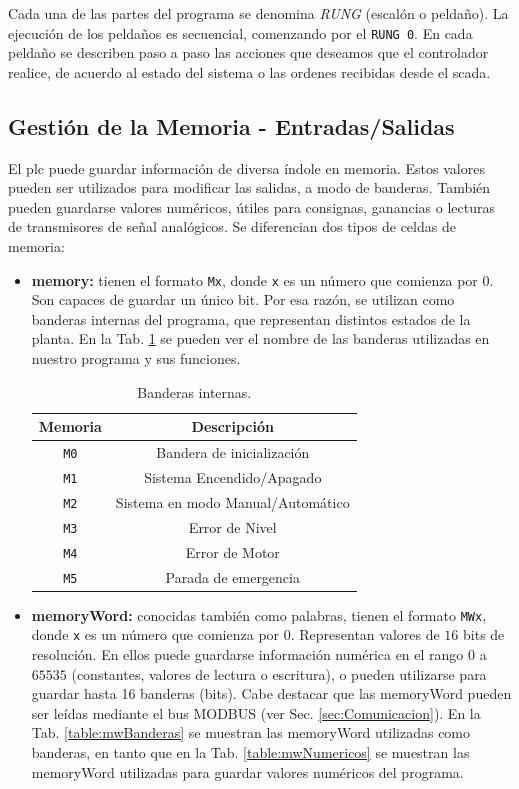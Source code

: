 Cada una de las partes del programa se denomina \emph{RUNG} (escalón o
peldaño).
La ejecución de los peldaños es secuencial, comenzando por el  \verb|RUNG 0|.
En cada peldaño se describen paso a paso las acciones que deseamos que
el controlador realice, de acuerdo al estado del sistema o las ordenes
recibidas desde el \gls{scada}.

\subsection{Gestión de la Memoria - Entradas/Salidas}

El \gls{plc} puede guardar información de diversa índole en memoria.
Estos valores pueden ser utilizados para modificar las salidas, a
modo de banderas.
También pueden guardarse valores numéricos, útiles para consignas,
ganancias o lecturas de transmisores de señal analógicos.
Se diferencian dos tipos de celdas de memoria:

\begin{itemize}
 \item \textbf{\gls{memory}:} tienen el formato \verb|Mx|, donde \verb|x| es un
número que comienza por $0$.
Son capaces de guardar un único bit.
Por esa razón, se utilizan como banderas internas del programa, que representan
distintos estados de la planta.
En la Tab. \ref{table:Banderasinternas} se pueden ver el nombre
de las banderas utilizadas en nuestro programa y sus funciones.
\begin{table}[ht]
\renewcommand{\arraystretch}{1.3}
\centering
\begin{tabular}{c||c}
\hline
\bfseries Memoria & \bfseries Descripción\\
\hline \hline
\verb|M0|  & Bandera de inicialización\\
\verb|M1|  & Sistema Encendido/Apagado\\
\verb|M2|  & Sistema en modo Manual/Automático\\
\verb|M3|  & Error de Nivel\\
\verb|M4|  & Error de Motor\\
\verb|M5|  & Parada de emergencia\\
\hline
\end{tabular}
\caption{Banderas internas.}
\label{table:Banderasinternas}
\end{table}

 \item \textbf{\gls{memoryWord}:} conocidas también como palabras, tienen el
formato \verb|MWx|, donde \verb|x| es un número que comienza por $0$.
Representan valores de $16$ bits de resolución. En ellos puede guardarse
información numérica en el rango $0$ a $65535$
(constantes, valores de lectura o escritura), o pueden utilizarse para guardar
hasta 16 banderas (bits).
Cabe destacar que las \gls{memoryWord} pueden ser leídas mediante el bus MODBUS
(ver Sec. \ref{sec:Comunicacion}).
En la Tab. \ref{table:mwBanderas} se muestran las \gls{memoryWord}
utilizadas como banderas, en tanto que en la Tab.
\ref{table:mwNumericos}
se muestran las \gls{memoryWord} utilizadas para guardar valores numéricos del
programa.
\end{itemize}


